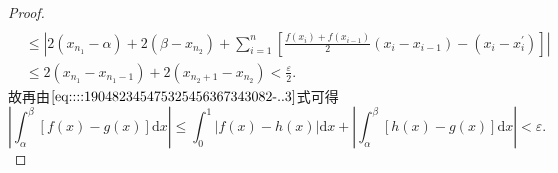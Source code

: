 \documentclass[../../main.tex]{subfiles}%
\begin{document}
\begin{proof}
\begin{align*}
\\
&\leqslant \left| 2\left( x_{n_1}-\alpha \right) +2\left( \beta -x_{n_2} \right) +\sum_{i=1}^n{\left[ \frac{f\left( x_i \right) +f\left( x_{i-1} \right)}{2}\left( x_i-x_{i-1} \right) -\left( x_i-x_{i}^{\prime} \right) \right]} \right|
\\
&\leqslant 2\left( x_{n_1}-x_{n_1-1} \right) +2\left( x_{n_2+1}-x_{n_2} \right) <\frac{\varepsilon}{2}.
\end{align*}
故再由\(\eqref{eq::::190482345475325456367343082-..3}\)式可得
\[
\left| \int_{\alpha}^{\beta} \left[ f(x) - g(x) \right] \mathrm{d}x \right| \leqslant \int_0^1 \left| f(x) - h(x) \right| \mathrm{d}x + \left| \int_{\alpha}^{\beta} \left[ h(x) - g(x) \right] \mathrm{d}x \right| < \varepsilon.
\]

\end{proof}
\end{document}
